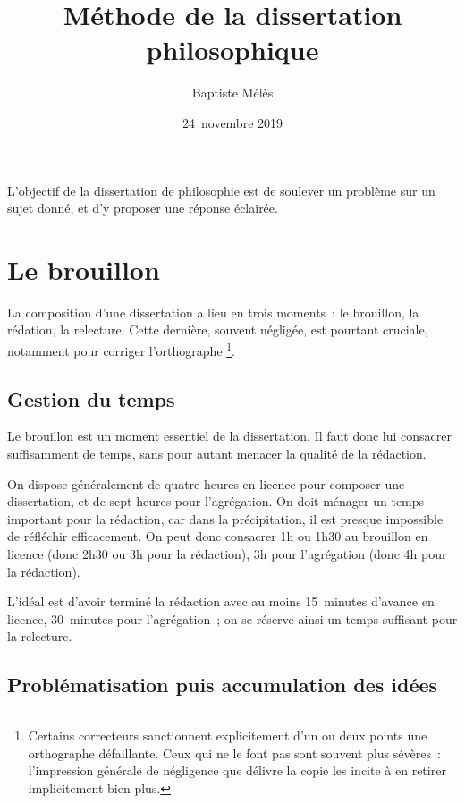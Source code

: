\documentclass[a4paper,12pt]{article}
\author{Baptiste Mélès}
\date{24 novembre 2019}
\title{Méthode de la dissertation philosophique}
\begin{document}
\maketitle
\setcounter{tocdepth}{3}
\tableofcontents

\bigskip

L'objectif de la dissertation de philosophie est de soulever un problème
sur un sujet donné, et d'y proposer une réponse éclairée.


\section{Le brouillon}
\label{sec-1}

La composition d'une dissertation a lieu en trois moments : le
brouillon, la rédation, la relecture. Cette dernière, souvent négligée,
est pourtant cruciale, notamment pour corriger l'orthographe \footnote{Certains correcteurs sanctionnent explicitement d'un ou deux points
une orthographe défaillante. Ceux qui ne le font pas sont souvent
plus sévères : l'impression générale de négligence que délivre la
copie les incite à en retirer implicitement bien plus.}.

\subsection{Gestion du temps}
\label{sec-1-1}

Le brouillon est un moment essentiel de la dissertation. Il faut donc
lui consacrer suffisamment de temps, sans pour autant menacer la qualité
de la rédaction.

On dispose généralement de quatre heures en licence pour composer une
dissertation, et de sept heures pour l'agrégation. On doit ménager un
temps important pour la rédaction, car dans la précipitation, il est
presque impossible de réfléchir efficacement. On peut donc consacrer 1h
ou 1h30 au brouillon en licence (donc 2h30 ou 3h pour la rédaction), 3h
pour l'agrégation (donc 4h pour la rédaction).

L'idéal est d'avoir terminé la rédaction avec au moins 15 minutes
d'avance en licence, 30 minutes pour l'agrégation ; on se réserve ainsi
un temps suffisant pour la relecture.

\subsection{Problématisation puis accumulation des idées}
\label{sec-1-2}
\end{document}
